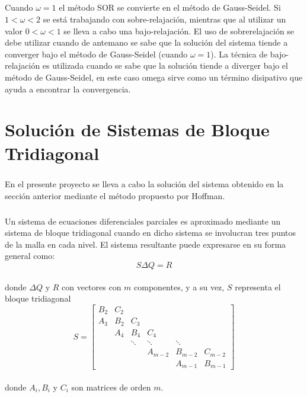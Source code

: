 \documentclass[letterpaper, openright, 12pt]{book}
\begin{document}
    \paragraph*{}
        Cuando $\omega = 1$ el método SOR se convierte en el método de
        Gauss-Seidel. Si $1 < \omega < 2$ se está trabajando con
        sobre-relajación, mientras que al utilizar un valor $0 < \omega < 1$ se
        lleva a cabo una bajo-relajación. El uso de sobrerelajación se debe
        utilizar cuando de antemano se sabe que la solución del sistema tiende a
        converger bajo el método de Gauss-Seidel (cuando $\omega = 1$). La
        técnica de bajo-relajación es utilizada cuando se sabe que la solución
        tiende a diverger bajo el método de Gauss-Seidel, en este caso omega
        sirve como un término disipativo que ayuda a encontrar la convergencia.

\chapter{Solución de Sistemas de Bloque Tridiagonal}\label{appTridiagonal}
    \paragraph*{}
        En el presente proyecto se lleva a cabo la solución del sistema obtenido
        en la sección anterior mediante el método propuesto por
        Hoffman\cite{hoffmann2000computational}.
    \paragraph*{}
        Un sistema de ecuaciones diferenciales parciales es aproximado mediante
        un sistema de bloque tridiagonal cuando en dicho sistema se involucran
        tres puntos de la malla en cada nivel. El sistema resultante puede
        expresarse en su forma general como:
        \begin{equation}
            S \Delta Q = R
            \label{hyper-sol-1}
        \end{equation}\\
        donde $\Delta Q$ y $R$ con vectores con $m$ componentes, y a su vez, $S$
        representa el bloque tridiagonal
        \begin{equation*}
            S = \begin{bmatrix}
            B_2 & C_2\\
            A_3 & B_2 & C_3\\
            & A_4 & B_4 & C_4\\
            & & \ddots & \ddots & \ddots\\
            & & & A_{m-2} & B_{m-2} & C_{m-2}\\
            & & & & A_{m-1} & B_{m-1}
            \end{bmatrix}
        \end{equation*}\\
        donde $A_i, B_i$ y $C_i$ son matrices de orden $m$.
\end{document}
